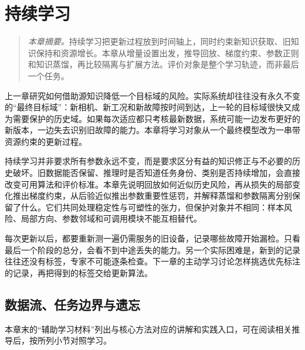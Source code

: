 ﻿\chapter{持续学习}
\label{chap:continual}
\begin{quote}\small
\textit{本章摘要。}持续学习把更新过程放到时间轴上，同时约束新知识获取、旧知识保持和资源增长。本章从增量设置出发，推导回放、梯度约束、参数正则和知识蒸馏，再比较隔离与扩展方法。评价对象是整个学习轨迹，而非最后一个任务。
\end{quote}

上一章研究如何借助源知识降低一个目标域的风险。实际系统却往往没有永久不变的“最终目标域”：新相机、新工况和新故障按时间到达，上一轮的目标域很快又成为需要保护的历史域。如果每次适应都只考核最新数据，系统可能一边发布更好的新版本，一边失去识别旧故障的能力。本章将学习对象从一个最终模型改为一串带资源约束的更新过程。

持续学习并非要求所有参数永远不变，而是要求区分有益的知识修正与不必要的历史破坏。旧数据能否保留、推理时是否知道任务身份、类别是否持续增加，会直接改变可用算法和评价标准。本章先说明回放如何近似历史风险，再从损失的局部变化推出梯度约束，从后验近似推出参数重要性惩罚，并解释蒸馏和参数隔离分别保留了什么。它们共同处理稳定性与可塑性的张力，但保护对象并不相同：样本风险、局部方向、参数邻域和可调用模块不能互相替代。

每次更新以后，都要重新测一遍仍需服务的旧设备，记录哪些故障开始漏检。只看最后一个阶段的总分，会看不到中途丢失的能力。另一个实际困难是，新到的记录往往还没有标签，专家不可能逐条检查。下一章的主动学习讨论怎样挑选优先标注的记录，再把得到的标签交给更新算法。

\section{数据流、任务边界与遗忘}

本章末的“辅助学习材料”列出与核心方法对应的讲解和实践入口，可在阅读相关推导后，按所列小节对照学习。

